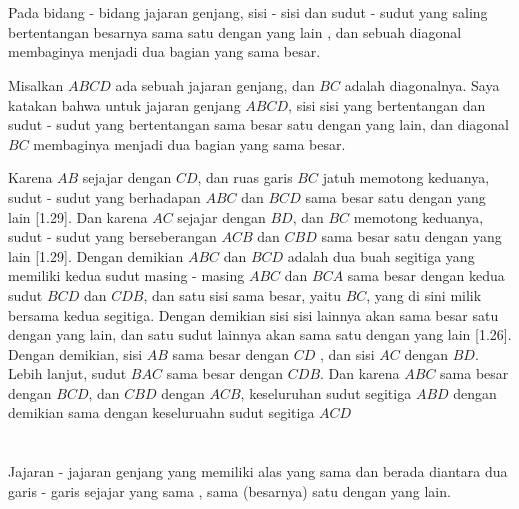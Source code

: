 \documentclass[a4paper, 12pt]{book}
\begin{document}
\setcounter{section}{34}
\section*{\centering \thesection}

Pada bidang - bidang jajaran genjang, sisi - sisi dan sudut - sudut yang saling
bertentangan besarnya sama satu dengan yang lain , dan sebuah diagonal membaginya
menjadi dua bagian yang sama besar.


Misalkan $ABCD$ ada sebuah jajaran genjang, dan $BC$ adalah diagonalnya. Saya katakan
bahwa untuk jajaran genjang $ABCD$, sisi sisi yang bertentangan dan sudut - sudut yang bertentangan
sama besar satu dengan yang lain, dan diagonal $BC$ membaginya menjadi dua bagian yang sama besar.

Karena $AB$ sejajar dengan $CD$, dan ruas garis $BC$ jatuh memotong keduanya, sudut - sudut yang 
berhadapan $ABC$ dan $BCD$ sama besar satu dengan yang lain [1.29]. Dan karena $AC$ sejajar dengan
$BD$, dan $BC$ memotong keduanya, sudut - sudut yang berseberangan $ACB$ dan $CBD$ sama besar satu 
dengan yang lain [1.29]. Dengan demikian $ABC$ dan $BCD$ adalah dua buah segitiga yang memiliki
kedua sudut masing - masing $ABC$ dan $BCA$ sama besar dengan kedua sudut $BCD$ dan $CDB$, dan satu 
sisi sama besar, yaitu $BC$, yang di sini milik bersama kedua segitiga.
Dengan demikian sisi sisi lainnya akan sama besar satu dengan yang lain, 
dan satu sudut lainnya akan sama satu dengan yang lain [1.26]. Dengan demikian, sisi $AB$ 
sama besar dengan $CD$ , dan sisi $AC$ dengan $BD$. Lebih lanjut, sudut $BAC$ sama besar
dengan $CDB$. Dan karena $ABC$ sama besar dengan $BCD$, dan $CBD$ dengan $ACB$, keseluruhan
sudut segitiga $ABD$ dengan demikian sama dengan keseluruahn  sudut segitiga $ACD$


\section*{\centering \thesection}
\par Jajaran - jajaran genjang yang memiliki alas yang sama dan berada diantara dua
garis - garis sejajar yang sama , sama (besarnya) satu dengan yang lain.  
\end{document}
